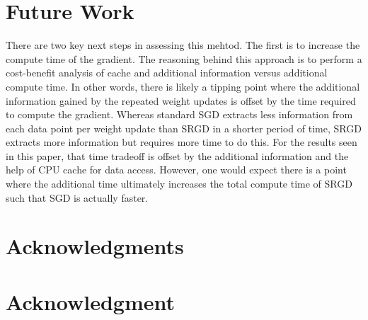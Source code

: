 \documentclass[conference,compsoc]{IEEEtran}
\begin{document}


\section{Future Work}
There are two key next steps in assessing this mehtod. The first
is to increase the compute time of the gradient. The reasoning behind
this approach is to perform a cost-benefit analysis of cache and
additional information versus additional compute time. In other words,
there is likely a tipping point where the additional information gained
by the repeated weight updates is offset by the time required to compute
the gradient. Whereas standard SGD extracts less information from
each data point per weight update than SRGD in a shorter period of time,
SRGD extracts more information but requires more time to do this. For the
results seen in this paper, that time tradeoff is offset by the additional
information and the help of CPU cache for data access. However, one would
expect there is a point where the additional time ultimately increases
the total compute time of SRGD such that SGD is actually faster.






\ifCLASSOPTIONcompsoc
  \section*{Acknowledgments}
\else
  \section*{Acknowledgment}
\fi




\end{document}
